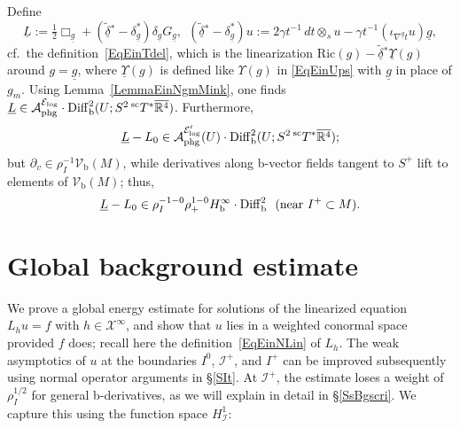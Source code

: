 \documentclass[reqno,11pt,letterpaper]{amsart}
\numberwithin{equation}{section}
\numberwithin{figure}{section}
\theoremstyle{definition}
\theoremstyle{remark}
\newcommand{\mc}{\mathcal}
\newcommand{\cA}{\mc A}
\newcommand{\cE}{\mc E}
\newcommand{\cX}{\mc X}
\newcommand{\ms}{\mathscr}
\newcommand{\scri}{\ms I}
\newcommand{\R}{\mathbb{R}}
\newcommand{\Ups}{\Upsilon}
\newcommand{\ol}{\overline}
\newcommand{\pa}{\partial}
\newcommand{\tn}{\textnormal}
\newcommand{\ul}[1]{\underline{#1}{}}
\newcommand{\wt}{\widetilde}
\newcommand{\bop}{{\mathrm{b}}}
\newcommand{\scl}{{\mathrm{sc}}}
\newcommand{\Diff}{\mathrm{Diff}}
\newcommand{\Vf}{\mathcal V}
\newcommand{\Vb}{\Vf_\bop}
\newcommand{\Diffb}{\Diff_\bop}
\newcommand{\Tsc}{{}^{\scl}T}
\newcommand{\half}{\tfrac{1}{2}}
\newcommand{\Hb}{H_{\bop}}
\newcommand{\Hscri}{H_{\scri}}
\newcommand{\phg}{{\mathrm{phg}}}
\newcommand{\tdel}{\wt{\delta}{}}
\newcommand{\Ric}{\mathrm{Ric}}
\begin{document}
Define
\begin{equation}
\label{EqEinNipulL}
  \ul L := \half\Box_{\ul g} + (\ul\tdel^*-\delta_{\ul g}^*)\delta_{\ul g}G_{\ul g}, \ \ (\ul\tdel^*-\delta_{\ul g}^*)u := 2\gamma t^{-1}\,dt\otimes_s u - \gamma t^{-1}(\iota_{\nabla^{\ul g}t}u)\ul g,
\end{equation}
cf.\ the definition~\eqref{EqEinTdel}, which is the linearization $\Ric(g)-\ul\tdel^*\ul\Ups(g)$ around $g=\ul g$, where $\ul\Ups(g)$ is defined like $\Ups(g)$ in \eqref{EqEinUps} with $\ul g$ in place of $g_m$. Using Lemma~\ref{LemmaEinNgmMink}, one finds $\ul L\in \cA_\phg^{\cE_{\rm log}}\cdot\Diffb^2(U;S^2\,\Tsc^*\ol{\R^4})$. Furthermore,
\begin{equation}
\label{EqEinNipulLL0}
  \ul L-L_0\in\cA_\phg^{\cE'_{\rm log}}(U)\cdot\Diffb^2(U;S^2\,\Tsc^*\ol{\R^4});
\end{equation}
but $\pa_v\in\rho_I^{-1}\Vb(M)$, while derivatives along b-vector fields tangent to $S^+$ lift to elements of $\Vb(M)$; thus,
\begin{equation}
\label{EqEinNipL0}
  \ul L-L_0\in\rho_I^{-1-0}\rho_+^{1-0}\Hb^\infty\cdot\Diffb^2\ \ (\tn{near}\ I^+\subset M).
\end{equation}


\section{Global background estimate}
\label{SBg}

We prove a global energy estimate for solutions of the linearized equation $L_h u=f$ with $h\in\cX^\infty$, and show that $u$ lies in a weighted conormal space provided $f$ does; recall here the definition~\eqref{EqEinNLin} of $L_h$. The weak asymptotics of $u$ at the boundaries $I^0$, $\scri^+$, and $I^+$ can be improved subsequently using normal operator arguments in \S\ref{SIt}. At $\scri^+$, the estimate loses a weight of $\rho_I^{1/2}$ for general b-derivatives, as we will explain in detail in \S\ref{SsBgscri}. We capture this using the function space $\Hscri^1$:
\end{document}
